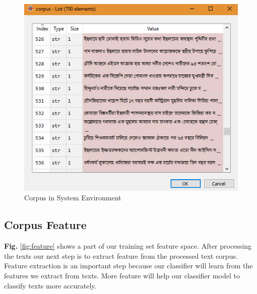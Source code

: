 \begin{figure}[h!]
    \centering
    \includegraphics[scale=0.6]{Figures/corpus.PNG}
    \caption{Corpus in System Environment}
    \label{fig:crps}
\end{figure}

\subsection{Corpus Feature}
\textbf{Fig.} \ref{fig:feature} shows a part of our training set feature space.
After processing the texts our next step is to extract feature from the processed text corpus. Feature extraction is an important step because our classifier will learn from the features we extract from texts. More feature will help our classifier model to classify texts more accurately.


